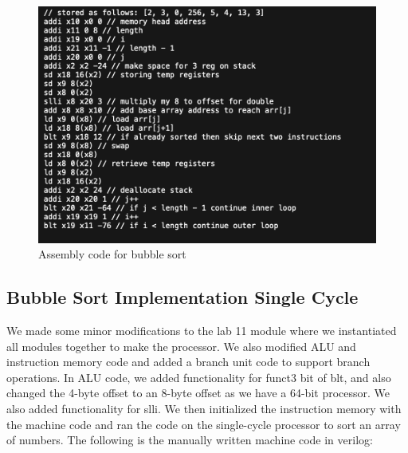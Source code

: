 \documentclass[12pt]{article}
\begin{document}
        \begin{figure}[htbp!]
            \centering
            \includegraphics[scale = 0.7]{images/bubbleSort.png}
            \caption{Assembly code for bubble sort}
        \end{figure}
        \begin{figure}[htbp!]
            \centering
        \end{figure}
        
\newpage

    \subsection{Bubble Sort Implementation Single Cycle}\label{task1-1}
        We made some minor modifications to the lab 11 module where we instantiated all modules together to make the processor. We also modified ALU and instruction memory code and added a branch unit code to support branch operations. In ALU code, we added functionality for funct3 bit of blt, and also changed the 4-byte offset to an 8-byte offset as we have a 64-bit processor. We also added functionality for slli. We then initialized the instruction memory with the machine code and ran the code on the single-cycle processor to sort an array of numbers. The following is the manually written machine code in verilog:
\end{document}
